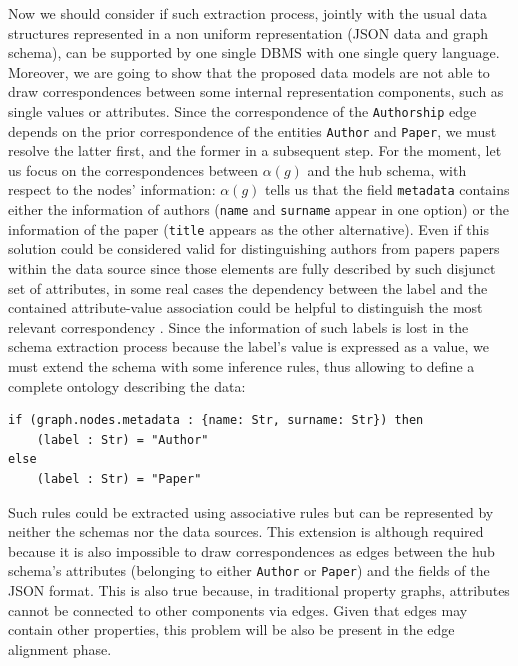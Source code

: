 \begin{example}[label=ex:examplegraphdata]
Now we should consider if such extraction process, jointly with the usual data structures represented in a non uniform representation (JSON data and graph schema), can be supported by one single DBMS with one single query language. Moreover, we are going to show that the proposed data models are not able to draw correspondences between some internal representation components, such as single values or attributes.  %
Since the correspondence of the \texttt{Authorship} edge depends on the prior correspondence of the entities \texttt{Author} and \texttt{Paper}, we must resolve the latter first, and the former in a subsequent step. For the moment, let us focus on the correspondences between $\alpha(g)$ and the hub schema, with respect to the nodes' information: $\alpha(g)$ tells us that the field \texttt{metadata} contains either the information of authors (\texttt{name} and \texttt{surname} appear in one option) or the information of the paper (\texttt{title} appears as the other alternative). Even if this solution could be considered valid for distinguishing authors from papers papers within the data source since those elements are fully described by such disjunct set of attributes, in some real cases the dependency between the label and the contained attribute-value association could be helpful to distinguish the most relevant correspondency \cite{IBMWatson}. Since the information of such labels is lost in the schema extraction process because the label's value is expressed as a value,  we must extend the schema with some inference rules, thus allowing to define a complete ontology describing the data:
\begin{lstlisting}[language=theoryjson,basicstyle=\ttfamily\small]
if (graph.nodes.metadata : {name: Str, surname: Str}) then
	(label : Str) = "Author"
else
	(label : Str) = "Paper"
\end{lstlisting}
Such rules could be extracted using associative rules \cite{Tan05} but can be represented by neither the schemas nor the data sources. This extension  is although required because it is also impossible to draw correspondences as edges between the hub schema's attributes (belonging to either \texttt{Author} or \texttt{Paper}) and the fields of the JSON format. This is also true because, in  traditional property graphs, attributes cannot be connected to other components via edges. Given that edges may contain other properties, this problem will be also be present in the edge alignment phase.


\end{example}
